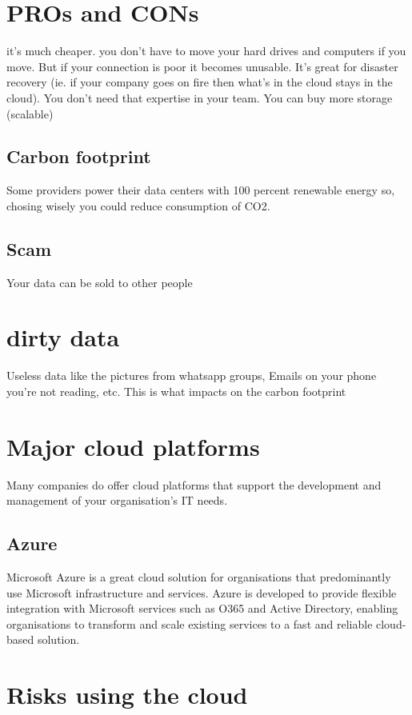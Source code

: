 \documentclass[a4paper,12pt]{book}
\begin{document}
\section{PROs and CONs}
it's much cheaper. you don't have to move your hard drives and computers if you move. But if your connection is poor it becomes unusable. It's great for disaster recovery (ie. if your company goes on fire then what's in the cloud stays in the cloud). You don't need that expertise in your team. You can buy more storage (scalable)

\subsection{Carbon footprint}
 Some providers power their data centers with 100 percent renewable energy so, chosing wisely you could reduce consumption of CO2. 

\subsection{Scam}
Your data can be sold to other people

\section{dirty data}
Useless data like the pictures from whatsapp groups, Emails on your phone you're not reading, etc. This is what impacts on the carbon footprint

\section{Major cloud platforms}
Many companies do offer cloud platforms that support the development and management of your organisation’s IT needs.
\subsection{Azure}
Microsoft Azure is a great cloud solution for organisations that predominantly use Microsoft infrastructure and services. Azure is developed to provide flexible integration with Microsoft services such as O365 and Active Directory, enabling organisations to transform and scale existing services to a fast and reliable cloud-based solution.

\clearpage
\section{Risks using the cloud}
\end{document}
